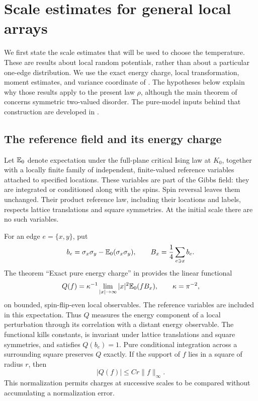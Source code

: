 \section{Scale estimates for general local arrays}
\label{sec:scale}

We first state the scale estimates that will be used to choose the
temperature.  These are results about local random potentials, rather
than about a particular one-edge distribution.  We use the exact energy
charge, local transformation, moment estimates, and variance coordinate
of \cite[Sections~2--5]{R}.  The hypotheses below explain why those
results apply to the present law \(\rho\), although the main theorem of
\cite{R} concerns symmetric two-valued disorder.  The pure-model inputs
behind that construction are developed in \cite[Sections~2--3]{S}.

\subsection{The reference field and its energy charge}

Let \(\mathbb E_0\) denote expectation under the full-plane critical Ising
law at \(K_0\), together with a locally finite family of independent,
finite-valued reference variables attached to specified locations.
These variables are part
of the Gibbs field: they are integrated or conditioned along with the
spins.  Spin reversal leaves them unchanged.  Their product reference
law, including their locations and labels, respects lattice translations
and square symmetries.  At the initial scale there are no such variables.

For an edge \(e=\{x,y\}\), put
\[
 b_e=\sigma_x\sigma_y-\mathbb E_0(\sigma_x\sigma_y),
 \qquad B_x=\frac14\sum_{e\ni x}b_e.
\]
The theorem ``Exact pure energy charge'' in \cite[Section~2]{R}
provides the linear functional
\begin{equation}
 Q(f)=\kappa^{-1}\lim_{|x|\to\infty}|x|^2\mathbb E_0(fB_x),
 \qquad \kappa=\pi^{-2},
\label{eq:energy-charge}
\end{equation}
on bounded, spin-flip-even local observables.  The reference variables
are included in this expectation.  Thus \(Q\) measures the energy
component of a local perturbation through its correlation with a
distant energy observable.  The functional kills constants,
is invariant under lattice translations and square symmetries, and
satisfies \(Q(b_e)=1\).  Pure conditional integration across a surrounding
square preserves \(Q\) exactly.  If the support of \(f\) lies in a square
of radius \(r\), then
\begin{equation}
 |Q(f)|\le C r\|f\|_\infty.
 \label{eq:charge-bound}
\end{equation}
This normalization permits charges at successive scales to be compared
without accumulating a normalization error.

